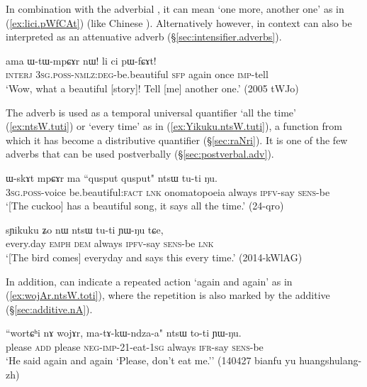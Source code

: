 In combination with the adverbial , it can mean `one more, another one' as in (\ref{ex:lici.pWfCAt}) (like Chinese ). Alternatively however,  in context can also be interpreted as an attenuative adverb (§\ref{sec:intensifier.adverbs}).
 
\begin{exe}
\ex \label{ex:lici.pWfCAt}
\gll ama ɯ-tɯ-mpɕɤr nɯ! li ci pɯ-fɕɤt! \\
\textsc{interj} \textsc{3sg}.\textsc{poss}-\textsc{nmlz}:\textsc{deg}-be.beautiful \textsc{sfp} again once \textsc{imp}-tell \\
\glt `Wow, what a beautiful [story]! Tell [me] another one.' (2005 tWJo)
\end{exe}
 
 The adverb  is used as a temporal universal quantifier `all the time' (\ref{ex:ntsW.tuti}) or `every time' as in (\ref{ex:Yikuku.ntsW.tuti}), a function from which it has become a distributive quantifier (§\ref{sec:raNri}). It is one of the few adverbs that can be used postverbally (§\ref{sec:postverbal.adv}).

\begin{exe}
\ex \label{ex:ntsW.tuti}
\gll  ɯ-skɤt mpɕɤr ma {``qusput qusput"} ntsɯ tu-ti ŋu. \\
\textsc{3sg}.\textsc{poss}-voice be.beautiful:\textsc{fact} \textsc{lnk} onomatopoeia always \textsc{ipfv}-say \textsc{sens}-be \\
\glt `[The cuckoo] has a beautiful song, it says  all the time.' (24-qro)
 \end{exe} 
 
\begin{exe}
\ex \label{ex:Yikuku.ntsW.tuti}
\gll   sɲikuku ʑo nɯ ntsɯ tu-ti ɲɯ-ŋu tɕe, \\
every.day \textsc{emph} \textsc{dem} always \textsc{ipfv}-say \textsc{sens}-be \textsc{lnk} \\
\glt `[The bird comes] everyday and says this every time.'  (2014-kWlAG)
 \end{exe}
 
In addition,  can indicate a repeated action `again and again' as in (\ref{ex:wojAr.ntsW.toti}), where the repetition is also marked by the additive  (§\ref{sec:additive.nA}).

\begin{exe}
\ex \label{ex:wojAr.ntsW.toti}
\gll ``wortɕʰi nɤ wojɤr, ma-tɤ-kɯ-ndza-a" ntsɯ to-ti ɲɯ-ŋu. \\
please \textsc{add} please \textsc{neg}-\textsc{imp}-2\fl{}1-eat-\textsc{1sg} always \textsc{ifr}-say \textsc{sens}-be \\
\glt `He said again and again `Please, don't eat me.'' (140427 bianfu yu huangshulang-zh)
\end{exe}

